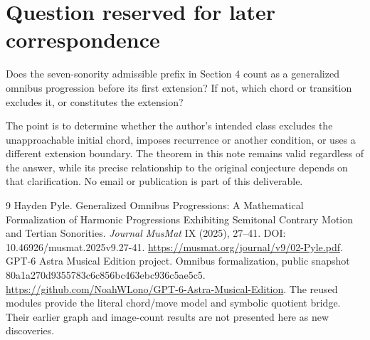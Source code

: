 \documentclass[11pt]{article}
\begin{document}
\appendix
\section{Question reserved for later correspondence}\label{app:question}
Does the seven-sonority admissible prefix in Section 4 count as a generalized
omnibus progression before its first extension? If not, which chord or
transition excludes it, or constitutes the extension?

The point is to determine whether the author's intended class excludes the
unapproachable initial chord, imposes recurrence or another condition, or
uses a different extension boundary. The theorem in this note remains valid
regardless of the answer, while its precise relationship to the original
conjecture depends on that clarification. No email or publication is part of
this deliverable.

\begin{thebibliography}{9}
 Hayden Pyle. Generalized Omnibus Progressions: A Mathematical
Formalization of Harmonic Progressions Exhibiting Semitonal Contrary Motion
and Tertian Sonorities. \emph{Journal MusMat} IX (2025), 27--41.
DOI: 10.46926/musmat.2025v9.27-41.
\url{https://musmat.org/journal/v9/02-Pyle.pdf}.
 GPT-6 Astra Musical Edition project. Omnibus formalization,
public snapshot 80a1a270d9355783c6c856bc463ebc936c5ae5c5.
\url{https://github.com/NoahWLono/GPT-6-Astra-Musical-Edition}.
The reused modules provide the literal chord/move model and symbolic quotient
bridge. Their earlier graph and image-count results are not presented here as
new discoveries.
\end{thebibliography}
\end{document}
